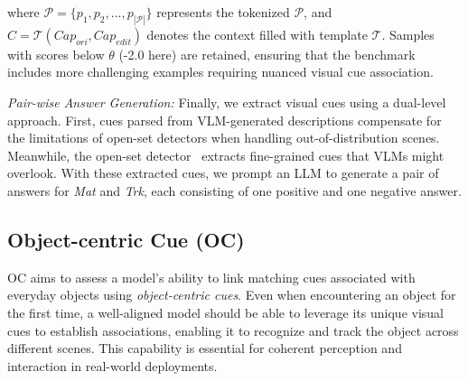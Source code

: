 \noindent where \( \mathcal{P} = \{p_1, p_2, ..., p_{|\mathcal{P}|}\} \) represents the tokenized \(\mathcal{P}\), and \( C = \mathcal{T} (Cap_{ori}, Cap_{edit}) \) denotes the context filled with template \(\mathcal{T}\). Samples with scores below \( \theta \) (-2.0 here) are retained, ensuring that the benchmark includes more challenging examples requiring nuanced visual cue association. 


\textit{Pair-wise Answer Generation:} Finally, we extract visual cues using a dual-level approach. First, cues parsed from VLM-generated descriptions compensate for the limitations of open-set detectors when handling out-of-distribution scenes. Meanwhile, the open-set detector~\citep{wu2022grit} extracts fine-grained cues that VLMs might overlook. With these extracted cues, we prompt an LLM to generate a pair of answers for \textit{Mat} and \textit{Trk}, each consisting of one positive and one negative answer.




\subsection{Object-centric Cue (OC)}
\label{oc}
OC aims to assess a model's ability to link matching cues associated with everyday objects using \textit{object-centric cues}. Even when encountering an object for the first time, a well-aligned model should be able to leverage its unique visual cues to establish associations, enabling it to recognize and track the object across different scenes. This capability is essential for coherent perception and interaction in real-world deployments.

